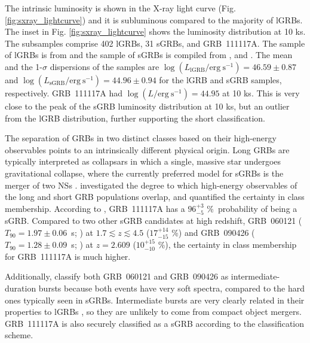 \documentclass[longauth]{aa}    %
\begin{document}
The intrinsic luminosity is shown in the X-ray light curve (Fig.
\ref{fig:sxray_lightcurve}) and it is subluminous compared to the majority of
lGRBs. The inset in Fig. \ref{fig:sxray_lightcurve} shows the luminosity
distribution at 10 ks. The subsamples comprise  402 lGRBs, 31 sGRBs, and
GRB~111117A. The sample of lGRBs is from \citet{Evans2007, Evans2009} and the
sample of sGRBs is compiled from \citet{Kann2011, Berger2014}, and
\citet{DAvanzo2014a}. The mean and the 1-$\sigma$ dispersions of the samples are
$\log(L_{\mathrm{lGRB}} / \mathrm{erg~s}^{-1}) = 46.59 \pm 0.87$ and
$\log(L_{\mathrm{sGRB}} / \mathrm{erg~s}^{-1})  = 44.96 \pm 0.94$ for the lGRB
and sGRB samples,  respectively. GRB~111117A had $\log(L / \mathrm{erg~s}^{-1}) =
44.95$ at 10 ks. This is very close to the peak of the sGRB luminosity
distribution at 10 ks, but an outlier from the lGRB distribution, further
supporting the short classification.

The separation of GRBs in two distinct classes based on their high-energy
observables points to an intrinsically different physical origin. Long GRBs are
typically interpreted as collapsars \citep{MacFadyen1999} in which a single, massive
star undergoes gravitational collapse, where the currently preferred model for
sGRBs is the merger of two NSs \citep{Eichler1989, Nakar2007}.
\citet{Bromberg2013} investigated the degree to which high-energy observables of
the long and short GRB populations overlap, and quantified the certainty in class
membership. According to \citet{Bromberg2013}, GRB~111117A has a $96_{-5}^{+3}$
\%\ probability of being a sGRB. Compared to two other sGRB candidates
at high redshift, GRB~060121 ($T_{90}=1.97 \pm 0.06$~s;
\citealt{DeUgartePostigo2006, Levan2006}) at $1.7 \lesssim z \lesssim 4.5$
($17_{-15}^{+14}$ \%) and GRB~090426 ($T_{90}=1.28 \pm 0.09$~s;
\citealt{Antonelli2009, Levesque2010, Thone2011}) at $z = 2.609$ ($10_{-10}^{+15}$
\%), the certainty in class membership for GRB~111117A is much higher.

Additionally, \citet{Horvath2010} classify both GRB~060121 and GRB~090426 as
intermediate-duration bursts because both events have very soft
spectra,  compared to the hard ones typically seen in sGRBs. Intermediate
bursts are very clearly related in their properties to  lGRBs
\citep{DeUgartePostigo2011}, so they are unlikely to come from compact object
mergers. GRB~111117A is also securely classified as a sGRB according to the
\citet{Horvath2010} classification scheme.
\end{document}
